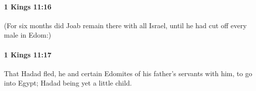		\paragraph{1 Kings 11:16} %
			\label{1KINGS-11-16}

			(For six months did Joab remain there with all Israel, until he had cut off every male in Edom:)


		\paragraph{1 Kings 11:17} %
			\label{1KINGS-11-17}

			That Hadad fled, he and certain Edomites of his father’s servants with him, to go into Egypt; Hadad being yet a little child.


